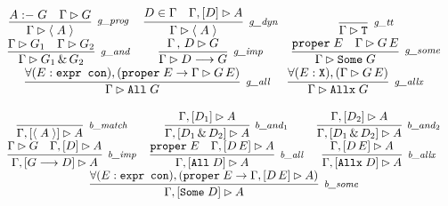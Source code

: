 {
\renewcommand{\arraystretch}{3.5}
\newcommand{\GRrlsbc}{\inferH[\rlnmsbc{}]{\seqsl[\Gamma]{\atom{A}}}{\prog{A}{G} & \seqsl[\Gamma]{G}}}
\newcommand{\GRrlsinit}{\inferH[\rlnmsinit{}]{\seqsl[\Gamma]{\atom{A}}}{D \in \Gamma & \bchsl[\Gamma]{D}{A}}}
\newcommand{\GRrlst}{\inferH[\rlnmst{}]{\seqsl[\Gamma]{\sltm{T}}}{}}
\newcommand{\GRrlsand}{\inferH[\rlnmsand{}]{\seqsl[\Gamma]{G_1 \, \& \, G_2}}{\seqsl[\Gamma]{G_1} & \seqsl[\Gamma]{G_2}}}
\newcommand{\GRrlsimp}{\inferH[\rlnmsimp{}]{\seqsl[\Gamma]{D \longrightarrow G}}{\seqsl[\Gamma \, , \, D]{G}}}
\newcommand{\GRrlsall}{\inferH[\rlnmsall{}]{\seqsl[\Gamma]{\sltm{All} \; G}}{\forall (E : \hybridtm{expr con}), (\sltm{proper} \; E \rightarrow \seqsl[\Gamma]{G \, E})}}
\newcommand{\GRrlsalls}{\inferH[\rlnmsalls{}]{\seqsl[\Gamma]{\sltm{Allx} \; G}}{\forall (E : \sltm{X}), (\seqsl[\Gamma]{G \, E})}}
\newcommand{\GRrlssome}{\inferH[\rlnmssome{}]{\seqsl[\Gamma]{\sltm{Some} \; G}}{\sltm{proper} \; E & \seqsl[\Gamma]{G \, E}}}

\begin{figure}%
$$
\begin{tabular}{c c c}
\GRrlsbc{}
&
\GRrlsinit{}
&
\GRrlst{} \\
%
\GRrlsand{}
&
\GRrlsimp{}
&
\GRrlssome{} \\
%
\multicolumn{3}{c}{
\GRrlsall{} \;\;\; \GRrlsalls{}
}
\end{tabular}
$$

\end{figure}
}
%
{
\renewcommand{\arraystretch}{3.5}
\newcommand{\BCrlbmatch}{\inferH[\rlnmbmatch{}]{\bchsl[\Gamma]{\atom{A}}{A}}{}}
\newcommand{\BCrlbanda}{\inferH[\rlnmbanda{}]{\bchsl[\Gamma]{D_1 \, \& \, D_2}{A}}{\bchsl[\Gamma]{D_1}{A}}}
\newcommand{\BCrlbandb}{\inferH[\rlnmbandb{}]{\bchsl[\Gamma]{D_1 \, \& \, D_2}{A}}{\bchsl[\Gamma]{D_2}{A}}}
\newcommand{\BCrlbimp}{\inferH[\rlnmbimp{}]{\bchsl[\Gamma]{G \longrightarrow D}{A}}{\seqsl[\Gamma]{G} & \bchsl[\Gamma]{D}{A}}}
\newcommand{\BCrlball}{\inferH[\rlnmball{}]{\bchsl[\Gamma]{\sltm{All} \; D}{A}}{\sltm{proper} \; E & \bchsl[\Gamma]{D \, E}{A}}}
\newcommand{\BCrlballs}{\inferH[\rlnmballs{}]{\bchsl[\Gamma]{\sltm{Allx} \; D}{A}}{\bchsl[\Gamma]{D \, E}{A}}}
\newcommand{\BCrlbsome}{\inferH[\rlnmbsome{}]{\bchsl[\Gamma]{\sltm{Some} \; D}{A}}{\forall (E : \hybridtm{expr con}), (\sltm{proper} \; E \rightarrow \bchsl[\Gamma]{D \, E}{A})}}

\begin{figure}%

$$
\begin{tabular}{c c c}
\BCrlbmatch{}
&
\BCrlbanda{}
&
\BCrlbandb{} \\
%
\BCrlbimp{}
&
\BCrlball{}
&
\BCrlballs{} \\
\multicolumn{3}{c}{
\BCrlbsome{}
}
\end{tabular}
$$

\end{figure}
}
